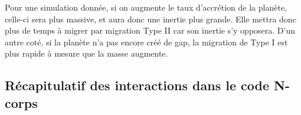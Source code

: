 \bigskip

Pour une simulation donnée, si on augmente le taux d'accrétion de la planète, celle-ci sera plus massive, et aura donc une inertie plus grande. Elle mettra donc plus de temps à migrer par migration Type II car son inertie s'y opposera. D'un autre coté, si la planète n'a pas encore créé de gap, la migration de Type I est plus rapide à mesure que la masse augmente. 


\subsection{Récapitulatif des interactions dans le code N-corps}
